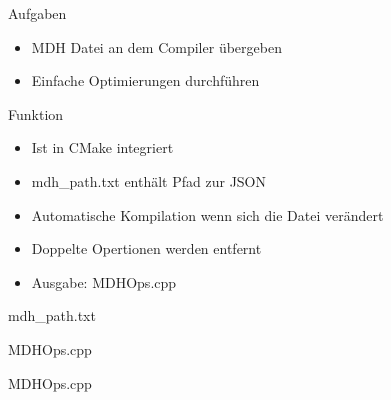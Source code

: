 \documentclass{../presentation}
\begin{document}
\frame[plain]{\titlepage}

\begin{frame}{Aufgaben}
    \begin{itemize}
        \item MDH Datei an dem Compiler übergeben
        \item Einfache Optimierungen durchführen
    \end{itemize}
\end{frame}

\begin{frame}{Funktion}
    \begin{itemize}
        \item Ist in CMake integriert
        \item mdh\_path.txt enthält Pfad zur JSON
        \item Automatische Kompilation wenn sich die Datei verändert
        \item Doppelte Opertionen werden entfernt
        \item Ausgabe: MDHOps.cpp
    \end{itemize}
\end{frame}

\begin{frame}{mdh\_path.txt}
    
\end{frame}

\begin{frame}{MDHOps.cpp}
    
\end{frame}

\begin{frame}{MDHOps.cpp}
    
\end{frame}
\end{document}
